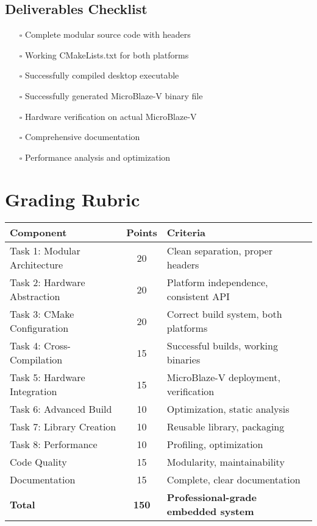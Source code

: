 \documentclass[11pt,a4paper]{article}
\begin{document}
\subsection{Deliverables Checklist}
\begin{itemize}
    \item[$\square$] Complete modular source code with headers
    \item[$\square$] Working CMakeLists.txt for both platforms
    \item[$\square$] Successfully compiled desktop executable
    \item[$\square$] Successfully generated MicroBlaze-V binary file
    \item[$\square$] Hardware verification on actual MicroBlaze-V
    \item[$\square$] Comprehensive documentation
    \item[$\square$] Performance analysis and optimization
\end{itemize}

\section{Grading Rubric}

\begin{center}
\begin{tabular}{|l|c|l|}
\hline
\textbf{Component} & \textbf{Points} & \textbf{Criteria} \\
\hline
Task 1: Modular Architecture & 20 & Clean separation, proper headers \\
Task 2: Hardware Abstraction & 20 & Platform independence, consistent API \\
Task 3: CMake Configuration & 20 & Correct build system, both platforms \\
Task 4: Cross-Compilation & 15 & Successful builds, working binaries \\
Task 5: Hardware Integration & 15 & MicroBlaze-V deployment, verification \\
Task 6: Advanced Build & 10 & Optimization, static analysis \\
Task 7: Library Creation & 10 & Reusable library, packaging \\
Task 8: Performance & 10 & Profiling, optimization \\
Code Quality & 15 & Modularity, maintainability \\
Documentation & 15 & Complete, clear documentation \\
\hline
\textbf{Total} & \textbf{150} & \textbf{Professional-grade embedded system} \\
\hline
\end{tabular}
\end{center}
\end{document}
